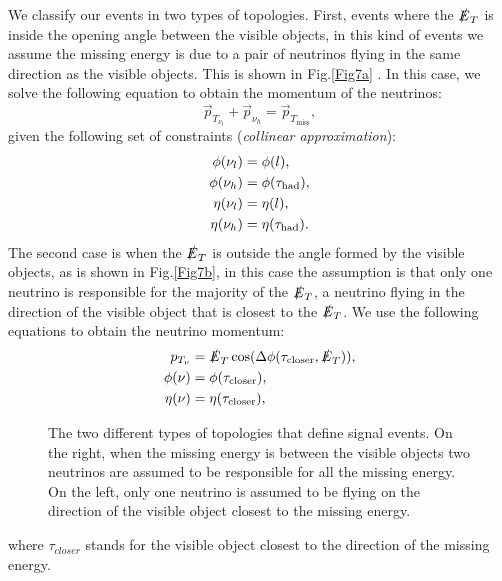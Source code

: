 We classify our events in two types of topologies. First, events where the $\slashed{E}_T$ is inside the opening angle between the visible objects, in this kind of events we assume the missing energy is due to a pair of neutrinos flying in the same direction as the visible objects. This is shown in Fig.\ref{Fig7a} . In this case, we solve the following equation to obtain the momentum of the neutrinos:
\begin{equation}
	\vec{p}_{T_{\nu_l}}+\vec{p}_{\nu_h}=\vec{p}_{T_{\text{miss}}},
\end{equation}
given the following set of constraints (\textit{collinear approximation}):
\begin{align}
	\phi(\nu_l)&=\phi(l),
	\\
	\phi(\nu_h)&=\phi(\tau_\text{had}),
	\\
	\eta(\nu_l)&=\eta(l),
	\\
	\eta(\nu_h)&=\eta(\tau_\text{had}).
\end{align}
The second case is when the $\slashed{E}_T$ is outside the angle formed by the visible objects, as is shown in Fig.\ref{Fig7b}, in this case the assumption is that only one neutrino is responsible for the majority of the $\slashed{E}_T$, a neutrino flying in the direction of the visible object that is closest to the $\slashed{E}_T$. We use the following equations to obtain the neutrino momentum:
\begin{align}
p_{T_{\nu}}&=\slashed{E}_T \cos(\Delta\phi(\tau_{\text{closer}},\slashed{E}_T)),
\\
\phi(\nu)&=\phi(\tau_{\text{closer}}),
\\
\eta(\nu)&=\eta(\tau_{\text{closer}}),
\end{align} 
\begin{figure}[ht]
	\centering
	\hfill
	\caption{The two different types of topologies that define signal events. On the right, when the missing energy is between the visible objects two neutrinos are assumed to be responsible for all the missing energy. On the left, only one neutrino is assumed to be flying on the direction of the visible object closest to the missing energy.}
	\label{Fig7}
\end{figure}
where $\tau_{closer}$ stands for the visible object closest to the direction of the missing energy.

